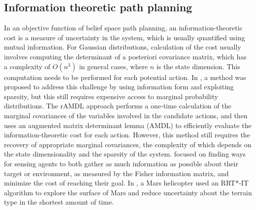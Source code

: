 \documentclass[Afour,sageh,times]{sagej}
\begin{document}
\subsection{Information theoretic path planning}
In an objective function of belief space path planning, an information-theoretic cost is a measure of uncertainty in the system, which is usually quantified using mutual information. 
For Gaussian distributions, calculation of the cost usually involves computing the determinant of a posteriori covariance matrix, which has a complexity of $O(n^3)$ in general cases, where $n$ is the state dimension. This computation needs to be performed for each potential action. In \cite{indelman2015planning_inf1}, a method was proposed to address this challenge by using information form and exploiting sparsity, but this still requires expensive access to marginal probability distributions. The rAMDL approach  \cite{kopitkov2017no_inf2} performs a one-time calculation of the marginal covariances of the variables involved in the candidate actions, and then uses an augmented matrix determinant lemma (AMDL) to efficiently evaluate the information-theoretic cost for each action. However, this method still requires the recovery of appropriate marginal covariances, the complexity of which depends on the state dimensionality and the sparsity of the system. \cite{levine2013information_inf3} focused on finding ways for sensing agents to both gather as much information as possible about their target or environment, as measured by the Fisher information matrix, and minimize the cost of reaching their goal. In \cite{folsom2021scalable_inf4}, a Mars helicopter used an RRT*-IT algorithm to explore the surface of Mars and reduce uncertainty about the terrain type in the shortest amount of time. 
\end{document}
